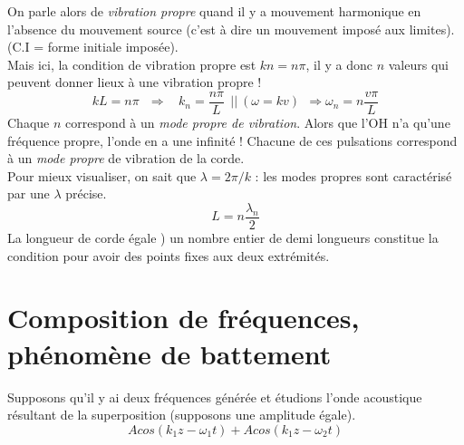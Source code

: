 \documentclass	[11pt, a4paper, openany]{book}
\begin{document}
On parle alors de \textit{vibration propre} quand il y a mouvement harmonique en l'absence du mouvement source (c'est à dire un mouvement imposé aux limites).(C.I =  forme initiale imposée).\\

Mais ici, la condition de vibration propre est $kn = n\pi$, il y a donc $n$ valeurs qui peuvent donner lieux à une vibration propre ! 
\begin{equation}
kL = n\pi\ \ \ \Rightarrow\ \ \ \ k_n = \frac{n\pi}{L}\ \ ||\ (\omega = kv) \ \ \Rightarrow \omega_n = n\frac{v\pi}{L}
\end{equation}
Chaque $n$ correspond à un \textit{mode propre de vibration}. Alors que l'OH n'a qu'une fréquence propre, l'onde en a une infinité ! Chacune de ces pulsations correspond à un \textit{mode propre} de vibration de la corde.\\

Pour mieux visualiser, on sait que $\lambda = 2\pi /k$ : les modes propres sont caractérisé par une $\lambda$ précise.
\begin{equation}
L = n\frac{\lambda_n}{2}
\end{equation}
La longueur de corde égale ) un nombre entier de demi longueurs constitue la condition pour avoir des points fixes aux deux extrémités.

\section{Composition de fréquences, phénomène de battement}
Supposons qu'il y ai  deux fréquences générée et étudions l'onde acoustique résultant de la superposition (supposons une amplitude égale).
\begin{equation}
Acos(k_1z - \omega_1 t) + Acos(k_1z - \omega_2 t)
\end{equation}
\end{document}
